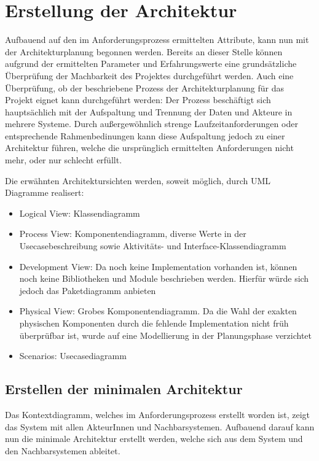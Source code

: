 \chapter{Erstellung der Architektur}
Aufbauend auf den im Anforderungsprozess ermittelten Attribute, kann nun mit der Architekturplanung begonnen werden. Bereits an dieser Stelle können aufgrund der ermittelten Parameter und Erfahrungswerte eine grundsätzliche Überprüfung der Machbarkeit des Projektes durchgeführt werden. Auch eine Überprüfung, ob der beschriebene Prozess der Architekturplanung für das Projekt eignet kann durchgeführt werden: Der Prozess beschäftigt sich hauptsächlich mit der Aufspaltung und Trennung der Daten und Akteure in mehrere Systeme. Durch außergewöhnlich strenge Laufzeitanforderungen oder entsprechende Rahmenbedinungen kann diese Aufspaltung jedoch zu einer Architektur führen, welche die ursprünglich ermittelten Anforderungen nicht mehr, oder nur schlecht erfüllt.

Die erwähnten Architektursichten werden, soweit möglich, durch UML Diagramme realisert:

\begin{itemize}
  \item Logical View: Klassendiagramm
  \item Process View: Komponentendiagramm, diverse Werte in der Usecasebeschreibung sowie Aktivitäts- und Interface-Klassendiagramm
  \item Development View: Da noch keine Implementation vorhanden ist, können noch keine Bibliotheken und Module beschrieben werden. Hierfür würde sich jedoch das Paketdiagramm anbieten
  \item Physical View: Grobes Komponentendiagramm. Da die Wahl der exakten physischen Komponenten durch die fehlende Implementation nicht früh überprüfbar ist, wurde auf eine Modellierung in der Planungsphase verzichtet
  \item Scenarios: Usecasediagramm
\end{itemize}

\section{Erstellen der minimalen Architektur}
Das Kontextdiagramm, welches im Anforderungsprozess erstellt worden ist, zeigt das System mit allen AkteurInnen und Nachbarsystemen. Aufbauend darauf kann nun die minimale Architektur erstellt werden, welche sich aus dem System und den Nachbarsystemen ableitet.

